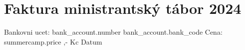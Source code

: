 \documentclass{article}
\begin{document}
\section{Faktura ministrantský tábor 2024}

Bankovni ucet: {{ bank_account.number }} {{ bank_account.bank_code }}
Cena: {{ summercamp.price }},- Kc
Datum
\end{document}
